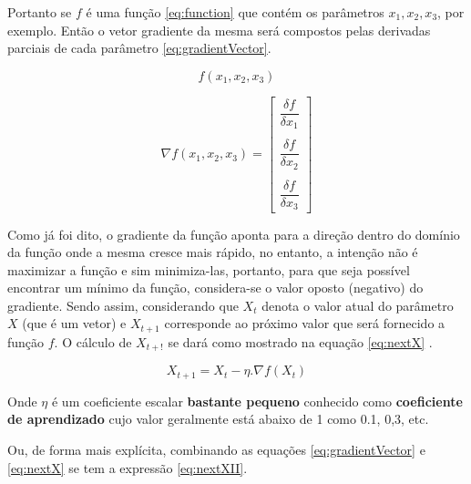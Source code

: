 \begin{apendicesenv}
		\par Portanto se $f$ é uma função \ref{eq:function}  que contém os parâmetros $x_1, x_2, x_3$, por exemplo. Então o vetor gradiente da mesma será compostos pelas derivadas parciais de cada parâmetro \ref{eq:gradientVector}.

		\begin{equation}\label{eq:function}
			f(x_1, x_2, x_3)
		\end{equation}

		\begin{equation}\label{eq:gradientVector}
			\nabla f(x_1, x_2, x_3) = \begin{bmatrix}
				\dfrac{\delta f}{\delta x_1}  \\\\
				\dfrac{\delta f}{\delta x_2}  \\\\
				\dfrac{\delta f}{\delta x_3} 
			\end{bmatrix}
		\end{equation}
	
		\par Como já foi dito, o gradiente da função aponta para a direção dentro do domínio da função onde a mesma cresce mais rápido, no entanto, a intenção não é maximizar a função e sim minimiza-las, portanto, para que seja possível encontrar um mínimo da função, considera-se o valor oposto (negativo) do gradiente. Sendo assim, considerando que $X_t$ denota o valor atual  do parâmetro $X$ (que é um vetor) e  $X_{t+1}$ corresponde ao próximo valor que será fornecido a função $f$. O cálculo de $X_{t+!}$ se dará como mostrado na equação \ref{eq:nextX} .
	
			\begin{equation}\label{eq:nextX}
				X_{t+1} = X_t  - \eta . \nabla f(X_t)
			\end{equation}
	
			\par Onde $\eta$ é um coeficiente escalar \textbf{bastante pequeno} conhecido como \textbf{coeficiente de aprendizado} cujo valor geralmente está abaixo de 1 como 0.1, 0,3, etc.
			
			\par Ou, de forma mais explícita, combinando as equações \ref{eq:gradientVector} e \ref{eq:nextX} se tem a expressão \ref{eq:nextXII}.
			

\end{apendicesenv}

